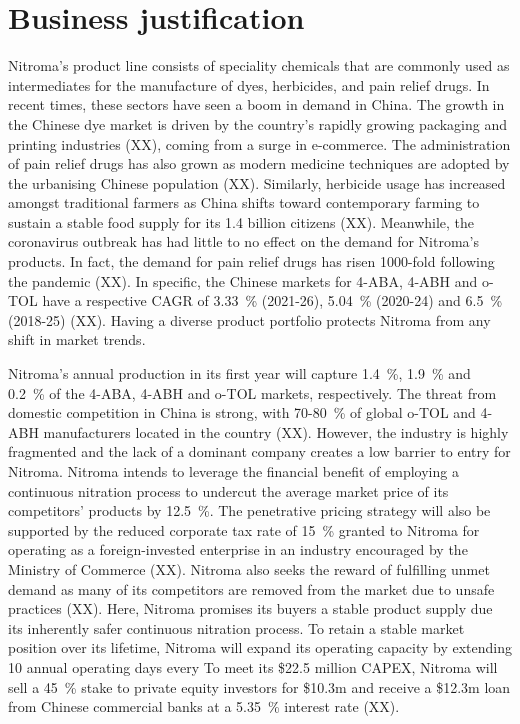 \section*{Business justification}

Nitroma’s product line consists of speciality chemicals that are commonly used as intermediates for the manufacture of dyes, herbicides, and pain relief drugs. In recent times, these sectors have seen a boom in demand in China. The growth in the Chinese dye market is driven by the country’s rapidly growing packaging and printing industries (XX), coming from a surge in e-commerce. The administration of pain relief drugs has also grown as modern medicine techniques are adopted by the urbanising Chinese population (XX). Similarly, herbicide usage has increased amongst traditional farmers as China shifts toward contemporary farming to sustain a stable food supply for its 1.4 billion citizens (XX). Meanwhile, the coronavirus outbreak has had little to no effect on the demand for Nitroma’s products. In fact, the demand for pain relief drugs has risen 1000-fold following the pandemic (XX). In specific, the Chinese markets for 4-ABA, 4-ABH and o-TOL have a respective CAGR of \SI{3.33}{\percent} (2021-26), \SI{5.04}{\percent} (2020-24) and \SI{6.5}{\percent} (2018-25) (XX). Having a diverse product portfolio protects Nitroma from any shift in market trends.

Nitroma’s annual production in its first year will capture \SI{1.4}{\percent}, \SI{1.9}{\percent} and \SI{0.2}{\percent} of the 4-ABA, 4-ABH and o-TOL markets, respectively. The threat from domestic competition in China is strong, with 70-\SI{80}{\percent} of global o-TOL and 4-ABH manufacturers located in the country (XX). However, the industry is highly fragmented and the lack of a dominant company creates a low barrier to entry for Nitroma. Nitroma intends to leverage the financial benefit of employing a continuous nitration process to undercut the average market price of its competitors’ products by \SI{12.5}{\percent}.  The penetrative pricing strategy will also be supported by the reduced corporate tax rate of \SI{15}{\percent} granted to Nitroma for operating as a foreign-invested enterprise in an industry encouraged by the Ministry of Commerce (XX). Nitroma also seeks the reward of fulfilling unmet demand as many of its competitors are removed from the market due to unsafe practices (XX). Here, Nitroma promises its buyers a stable product supply due its inherently safer continuous nitration process. To retain a stable market position over its lifetime, Nitroma will expand its operating %
capacity by extending 10 annual operating days every  
To meet its \$22.5 million CAPEX, Nitroma will sell a \SI{45}{\percent} stake to private equity investors for \$10.3m and receive a \$12.3m loan from Chinese commercial banks at a \SI{5.35}{\percent} interest rate (XX).

